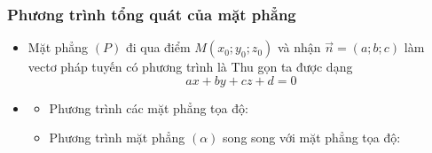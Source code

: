 \subsubsection{Phương trình tổng quát của mặt phẳng}
\begin{itemize}
	\item [\iconMT]  Mặt phẳng $(P)$ đi qua điểm $M(x_0;y_0;z_0)$ và nhận $\vec{n}=(a;b;c)$ làm vectơ pháp tuyến có phương trình là 
	Thu gọn ta được dạng 
	$$ax+by+cz+d=0$$
	\item [\iconMT] 
	\begin{boxdn}
		\begin{itemize}
			\item [\ding{172}] Phương trình các mặt phẳng tọa độ: 
			\item [\ding{173}] Phương trình mặt phẳng $(\alpha)$ song song với mặt phẳng tọa độ: 
		\end{itemize}
	\end{boxdn}
\end{itemize}

